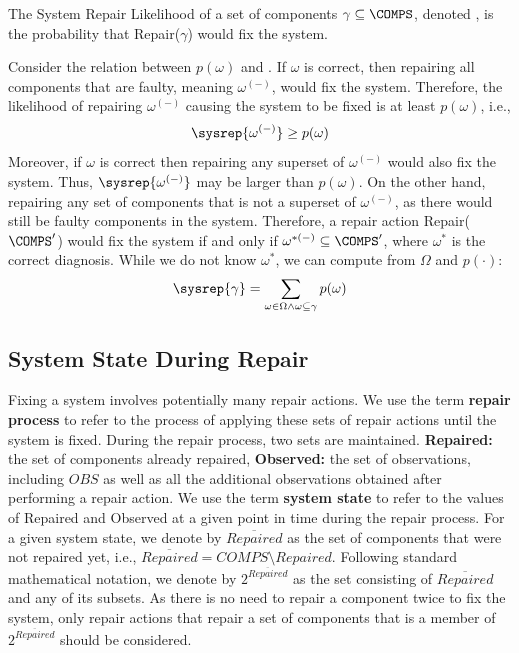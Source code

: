 \begin{definition}
The System Repair Likelihood of a set of components $\gamma\subseteq \COMPS$, denoted \sysrep{$\gamma$}, is the probability that Repair($\gamma$) would fix the system.
\end{definition}

Consider the relation between $p(\omega)$ and \sysrep{$\omega$}. If $\omega$ is correct, then repairing all components that are faulty, meaning $\omega^{(-)}$, would fix the system. Therefore, the likelihood of repairing $\omega^{(-)}$ causing the system to be fixed is at least $p(\omega)$, i.e.,
\[ \sysrep{\omega^{(-)}}\geq p(\omega)  \]
Moreover, if $\omega$ is correct then repairing any superset of $\omega^{(-)}$ would also fix the system. Thus, $\sysrep{\omega^{(-)}}$ may be larger than $p(\omega)$.
On the other hand, repairing any set of components that is not a superset of $\omega^{(-)}$, as there would still be faulty components in the system.
Therefore, a repair action Repair($\COMPS '$) would fix the system if and only if $\omega^{*{(-)}}\subseteq \COMPS '$, where $\omega^*$ is the correct diagnosis.
While we do not know $\omega^*$, we can compute \sysrep{$\gamma$} from $\Omega$ and $p(\cdot)$:
\[ \sysrep{\gamma} = \sum_{\omega\in \Omega \wedge \omega\subseteq \gamma} p(\omega) \]

\subsection{System State During Repair}
\label{sec:sysStateDuring}
Fixing a system involves potentially many repair actions. We use the term {\bf repair process} to refer to the process of applying these sets of repair actions until the system is fixed.
During the repair process, two sets are maintained. 
{\bf Repaired:} the set of components already repaired, 
{\bf Observed:} the set of observations, including $OBS$ as well as all the additional observations obtained after performing a repair action. 
We use the term {\bf system state} to refer to the values of Repaired and Observed at a given point in time during the repair process. For a given system state, we denote by $\overline{Repaired}$ as the set of components that were not repaired yet, i.e., $\overline{Repaired} = COMPS \setminus Repaired$. Following standard mathematical notation, we denote by $2^{\overline{Repaired}}$ as the set consisting of $\overline{Repaired}$ and any of its subsets. As there is no need to repair a component twice to fix the system, only repair actions that repair a set of components that is a member of $2^{\overline{Repaired}}$ should be considered.





